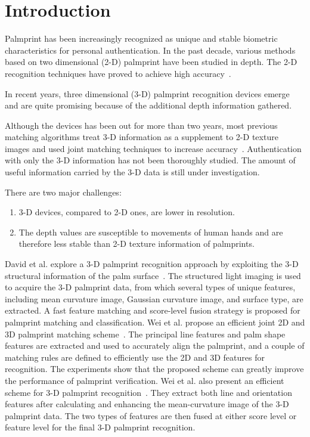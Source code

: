 \chapter{Introduction\label{ch:intro}}

Palmprint has been increasingly recognized as unique and stable biometric characteristics for personal authentication. In the past decade, various methods based on two dimensional (2-D) palmprint have been studied in depth. The 2-D recognition techniques have proved to achieve high accuracy~\cite{Kong:2009hj}.

In recent years, three dimensional (3-D) palmprint recognition devices emerge and are quite promising because of the additional depth information gathered.

Although the devices has been out for more than two years, most previous matching algorithms treat 3-D information as a supplement to 2-D texture images and used joint matching techniques to increase accuracy~\cite{Li:2011ur, Li:2010en, Zhang:2009dp, Zhang:2008kc, Zhang:2010uu}. Authentication with only the 3-D information has not been thoroughly studied. The amount of useful information carried by the 3-D data is still under investigation.

There are two major challenges:

\begin{enumerate}
	\item 3-D devices, compared to 2-D ones, are lower in resolution.
	\item The depth values are susceptible to movements of human hands and are therefore less stable than 2-D texture information of palmprints.
\end{enumerate}

David et al. explore a 3-D palmprint recognition approach by exploiting the 3-D structural information of the palm surface~\cite{Zhang:2009dp, Zhang:2008kc}. The structured light imaging is used to acquire the 3-D palmprint data, from which several types of unique features, including mean curvature image, Gaussian curvature image, and surface type, are extracted. A fast feature matching and score-level fusion strategy is proposed for palmprint matching and classification. Wei et al. propose an efficient joint 2D and 3D palmprint matching scheme~\cite{Li:2010en}. The principal line features and palm shape features are extracted and used to accurately align the palmprint, and a couple of matching rules are defined to efficiently use the 2D and 3D features for recognition. The experiments show that the proposed scheme can greatly improve the performance of palmprint verification. Wei et al. also present an efficient scheme for 3-D palmprint recognition~\cite{Li:2011ur}. They extract both line and orientation features after calculating and enhancing the mean-curvature image of the 3-D palmprint data. The two types of features are then fused at either score level or feature level for the final 3-D palmprint recognition.


